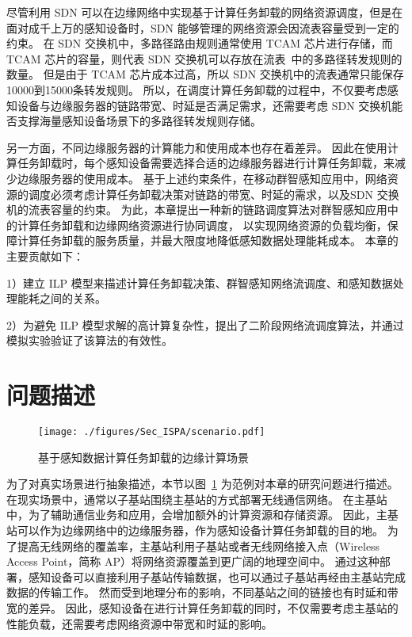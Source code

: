 尽管利用 SDN 可以在边缘网络中实现基于计算任务卸载的网络资源调度，但是在面对成千上万的感知设备时，SDN 能够管理的网络资源会因流表容量受到一定的约束。
在 SDN 交换机中，多路径路由规则通常使用 TCAM 芯片进行存储，而 TCAM 芯片的容量，则代表 SDN 交换机可以存放在流表~\cite{Dasgupta:2012:DMD:2400771.2401550}中的多路径转发规则的数量。
但是由于 TCAM 芯片成本过高，所以 SDN 交换机中的流表通常只能保存10000到15000条转发规则。
所以，在调度计算任务卸载的过程中，不仅要考虑感知设备与边缘服务器的链路带宽、时延是否满足需求，还需要考虑 SDN 交换机能否支撑海量感知设备场景下的多路径转发规则存储。

另一方面，不同边缘服务器的计算能力和使用成本也存在着差异。
因此在使用计算任务卸载时，每个感知设备需要选择合适的边缘服务器进行计算任务卸载，来减少边缘服务器的使用成本。
基于上述约束条件，在移动群智感知应用中，网络资源的调度必须考虑计算任务卸载决策对链路的带宽、时延的需求，以及SDN 交换机的流表容量的约束。
为此，本章提出一种新的链路调度算法对群智感知应用中的计算任务卸载和边缘网络资源进行协同调度，
以实现网络资源的负载均衡，保障计算任务卸载的服务质量，并最大限度地降低感知数据处理能耗成本。
本章的主要贡献如下：

1）建立 ILP 模型来描述计算任务卸载决策、群智感知网络流调度、和感知数据处理能耗之间的关系。

2）为避免 ILP 模型求解的高计算复杂性，提出了二阶段网络流调度算法，并通过模拟实验验证了该算法的有效性。

\section{问题描述}

\begin{figure}[!b]
  \centering
  \texttt{[image: ./figures/Sec\_ISPA/scenario.pdf]}
  \vspace{-1em}
  \caption{基于感知数据计算任务卸载的边缘计算场景}
  \label{fig_scenario}
\end{figure}

为了对真实场景进行抽象描述，本节以图~\ref{fig_scenario} 为范例对本章的研究问题进行描述。
在现实场景中，通常以子基站围绕主基站的方式部署无线通信网络。
在主基站中，为了辅助通信业务和应用，会增加额外的计算资源和存储资源。
因此，主基站可以作为边缘网络中的边缘服务器，作为感知设备计算任务卸载的目的地。
为了提高无线网络的覆盖率，主基站利用子基站或者无线网络接入点（Wireless Access Point，简称 AP）将网络资源覆盖到更广阔的地理空间中。
通过这种部署，感知设备可以直接利用子基站传输数据，也可以通过子基站再经由主基站完成数据的传输工作。
然而受到地理分布的影响，不同基站之间的链接也有时延和带宽的差异。
因此，感知设备在进行计算任务卸载的同时，不仅需要考虑主基站的性能负载，还需要考虑网络资源中带宽和时延的影响。

